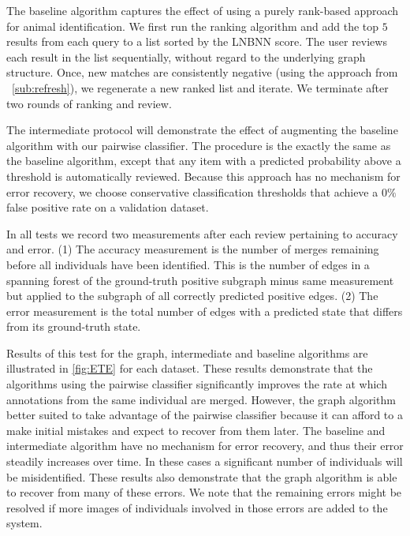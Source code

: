     The baseline algorithm captures the effect of using a purely rank-based approach for animal identification. We first
    run the ranking algorithm and add the top $5$ results from each query to a list sorted by the LNBNN score. The user
    reviews each result in the list sequentially, without regard to the underlying graph structure. Once, new matches
    are consistently negative (using the approach from ~\cref{sub:refresh}), we regenerate a new ranked list and
    iterate. We terminate after two rounds of ranking and review.

    The intermediate protocol will demonstrate the effect of augmenting the baseline algorithm with our pairwise
    classifier. The procedure is the exactly the same as the baseline algorithm, except that any item with a predicted
    probability above a threshold is automatically reviewed. Because this approach has no mechanism for error recovery,
    we choose conservative classification thresholds that achieve a $0\%$ false 
    positive rate on a validation dataset.

    In all tests we record two measurements after each review pertaining to accuracy and error. (1) The accuracy
    measurement is the number of merges remaining before all individuals have been identified. This is the number of
    edges in a spanning forest of the ground-truth positive subgraph minus same measurement but applied to the subgraph
    of all correctly predicted positive edges. (2) The error measurement is the total number of edges with a predicted
    state that differs from its ground-truth state.

    Results of this test for the graph, intermediate and baseline algorithms are illustrated in \cref{fig:ETE} for each
    dataset. These results demonstrate that the algorithms using the pairwise classifier significantly improves the rate
    at which annotations from the same individual are merged. However, the graph algorithm better suited to take
    advantage of the pairwise classifier because it can afford to a make initial mistakes and expect to recover from
    them later. The baseline and intermediate algorithm have no mechanism for error recovery, and thus their error
    steadily increases over time. In these cases a significant number of individuals will be misidentified. These
    results also demonstrate that the graph algorithm is able to recover from many of these errors. We note that the
    remaining errors might be resolved if more images of individuals involved in those errors are added to the system.

